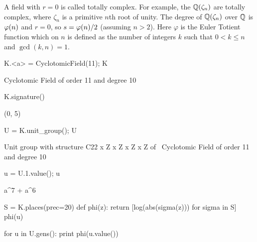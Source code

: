 A field with $r=0$ is called totally complex.  For
example, the  $\mathbb{Q}(\zeta_n)$ are totally
complex, where $\zeta_n$ is a primitive $n$th root of
unity.  The degree of $\mathbb{Q}(\zeta_n)$ over $\mathbb{Q}$ is $\varphi(n)$ and $r=0$,
so $s=\varphi(n)/2$ (assuming $n>2$).
Here $\varphi$ is the Euler Totient function which on $n$
is defined as the number of integers $k$ such that $0<k\leq n$
and $\gcd(k,n)=1$.
\begin{sagecode}
\begin{sagecell}
K.<a> = CyclotomicField(11); K
\end{sagecell}
\begin{sageout}
Cyclotomic Field of order 11 and degree 10
\end{sageout}
\begin{sagecell}
K.signature()
\end{sagecell}
\begin{sageout}
(0, 5)
\end{sageout}
\begin{sagecell}
U = K.unit_group(); U
\end{sagecell}
\begin{sageout}
Unit group with structure C22 x Z x Z x Z x Z of \
Cyclotomic Field of order 11 and degree 10
\end{sageout}
\begin{sagecell}
u = U.1.value(); u
\end{sagecell}
\begin{sageout}
a^7 + a^6
\end{sageout}
\begin{sagecell}
S = K.places(prec=20)
def phi(z):
    return [log(abs(sigma(z))) for sigma in S]
phi(u)
\end{sagecell}
\begin{sageout}
[-1.2566, -0.18533, 0.26982, 0.52028, 0.65180]
\end{sageout}
\begin{sagecell}
for u in U.gens():
    print phi(u.value())
\end{sagecell}
\begin{sageout}
[0.00000, 0.00000, 0.00000, -9.5367e-7, 0.00000]
[-1.2566, -0.18533, 0.26982, 0.52028, 0.65180]
[-0.26981, -0.52028, 0.18533, -0.65180, 1.2566]
[0.65180, 0.26981, -1.2566, -0.18533, 0.52029]
[-0.084486, -1.1721, -0.33496, 0.60477, 0.98675]
\end{sageout}
\end{sagecode}


